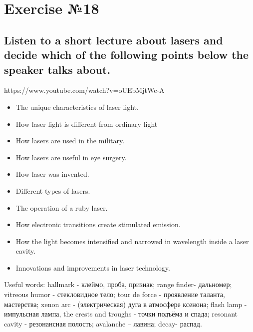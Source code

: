 \section*{Exercise №18}
\subsection*{Listen to a short lecture about lasers and decide which of the following points below the
      speaker talks about.}

https://www.youtube.com/watch?v=oUEbMjtWc-A

\begin{itemize}
      \item The unique characteristics of laser light.
      \item How laser light is different from ordinary light
      \item How lasers are used in the military.
      \item How lasers are useful in eye surgery.
      \item How laser was invented.
      \item Different types of lasers.
      \item The operation of a ruby laser.
      \item How electronic transitions create stimulated emission.
      \item How the light becomes intensified and narrowed in wavelength inside a laser cavity.
      \item Innovations and improvements in laser technology.
\end{itemize}

Useful words: hallmark - клеймо, проба, признак; range finder- дальномер; vitreous humor -
стекловидное тело; tour de force - проявление таланта, мастерства; xenon arc -
(электрическая) дуга в атмосфере ксенона; flash lamp - импульсная лампа, the crests and
troughs - точки подъёма и спада; resonant cavity - резонансная полость; avalanche – лавина;
decay- распад.

